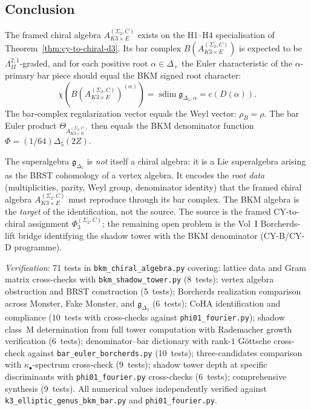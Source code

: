 \subsection{Conclusion}
\label{subsec:k3e-bkm-conclusion}

\begin{conjecture}
\label{conj:bkm-bar-dictionary}
The framed chiral algebra $A_{K3 \times E}^{(\Sigma_2,C)}$ exists on the H1--H4 specialisation of Theorem~\ref{thm:cy-to-chiral-d3}. Its bar complex $B(A_{K3 \times E}^{(\Sigma_2,C)})$ is expected to be $\Lambda^{2,1}_{II}$-graded, and for each positive root $\alpha \in \Delta_+$ the Euler characteristic of the $\alpha$-primary bar piece should equal the BKM signed root character:
\[
 \chi(B(A_{K3 \times E}^{(\Sigma_2,C)})^{(\alpha)}) = \operatorname{sdim}\mathfrak g_{\Delta_5,\alpha} = c(D(\alpha)).
\]
The bar-complex regularization vector equals the Weyl vector: $\rho_B = \rho$. The bar Euler product $\Theta_{A_{K3 \times E}^{(\Sigma_2,C)}}$ then equals the BKM denominator function $\Phi = (1/64)\Delta_5(2Z)$.
\end{conjecture}

The superalgebra $\mathfrak{g}_{\Delta_5}$ is \emph{not} itself a chiral algebra: it is a Lie superalgebra arising as the BRST cohomology of a vertex algebra. It encodes the \emph{root data} (multiplicities, parity, Weyl group, denominator identity) that the framed chiral algebra $A_{K3 \times E}^{(\Sigma_2,C)}$ must reproduce through its bar complex. The BKM algebra is the \emph{target} of the identification, not the source. The source is the framed CY-to-chiral assignment $\Phi_3^{(\Sigma_2,C)}$; the remaining open problem is the Vol~I Borcherds-lift bridge identifying the shadow tower with the BKM denominator (CY-B/CY-D programme).

\noindent\textit{Verification}: 71 tests in \texttt{bkm\_chiral\_algebra.py} covering: lattice data and Gram matrix cross-checks with \texttt{bkm\_shadow\_tower.py} (8~tests); vertex algebra obstruction and BRST construction (5~tests); Borcherds realization comparison across Monster, Fake Monster, and $\mathfrak{g}_{\Delta_5}$ (6~tests); CoHA identification and compliance (10~tests with cross-checks against \texttt{phi01\_fourier.py}); shadow class~M determination from full tower computation with Rademacher growth verification (6~tests); denominator--bar dictionary with rank-$1$ G\"ottsche cross-check against \texttt{bar\_euler\_borcherds.py} (10~tests); three-candidates comparison with $\kappa_\bullet$-spectrum cross-check (9~tests); shadow tower depth at specific discriminants with \texttt{phi01\_fourier.py} cross-checks (6~tests); comprehensive synthesis (9~tests). All numerical values independently verified against \texttt{k3\_elliptic\_genus\_bkm\_bar.py} and \texttt{phi01\_fourier.py}.

